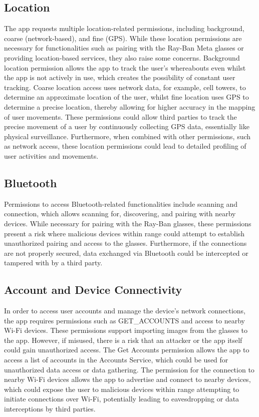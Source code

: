 \subsection*{Location}
The app requests multiple location-related permissions, including background, coarse (network-based), and fine (GPS). While these location permissions are necessary for functionalities such as pairing with the Ray-Ban Meta glasses or providing location-based services, they also raise some concerns. Background location permission allows the app to track the user's whereabouts even whilst the app is not actively in use, which creates the possibility of constant user tracking. Coarse location access uses network data, for example, cell towers, to determine an approximate location of the user, whilst fine location uses GPS to determine a precise location, thereby allowing for higher accuracy in the mapping of user movements. These permissions could allow third parties to track the precise movement of a user by continuously collecting GPS data, essentially like physical surveillance. Furthermore, when combined with other permissions, such as network access, these location permissions could lead to detailed profiling of user activities and movements.


\subsection*{Bluetooth}
Permissions to access Bluetooth-related functionalities include scanning and connection, which allows scanning for, discovering, and pairing with nearby devices. While necessary for pairing with the Ray-Ban glasses, these permissions present a risk where malicious devices within range could attempt to establish unauthorized pairing and access to the glasses. Furthermore, if the connections are not properly secured, data exchanged via Bluetooth could be intercepted or tampered with by a third party.

\subsection*{Account and Device Connectivity}
In order to access user accounts and manage the device's network connections, the app requires permissions such as GET\_ACCOUNTS and access to nearby Wi-Fi devices. These permissions support importing images from the glasses to the app. However, if misused, there is a risk that an attacker or the app itself could gain unauthorized access. The Get Accounts permission allows the app to access a list of accounts in the Accounts Service, which could be used for unauthorized data access or data gathering. The permission for the connection to nearby Wi-Fi devices allows the app to advertise and connect to nearby devices, which could expose the user to malicious devices within range attempting to initiate connections over Wi-Fi, potentially leading to eavesdropping or data interceptions by third parties.

